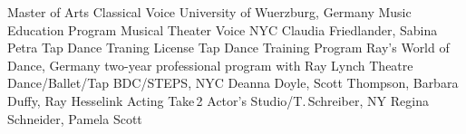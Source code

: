 \begin{cventries}
  \cventrytab
    {Master of Arts}
    {Classical Voice}
    {University of Wuerzburg, Germany}
    {Music Education Program}
 \cventrytab
    {}
    {Musical Theater Voice}
    {NYC}
    {Claudia Friedlander, Sabina Petra}
    \cventrytab
      {Tap Dance Traning License}
      {Tap Dance Training Program}
      {Ray's World of Dance, Germany}
      {two-year professional program with Ray Lynch}
    \cventrytab
      {}
      {Theatre Dance/Ballet/Tap}
      {BDC/STEPS, NYC}
      {Deanna Doyle, Scott Thompson, Barbara Duffy, Ray Hesselink}
    \cventrytab
      {}
      {Acting}
      {Take\,2 Actor's Studio/T.\,Schreiber, NY}
      {Regina Schneider, Pamela Scott}
\end{cventries}
